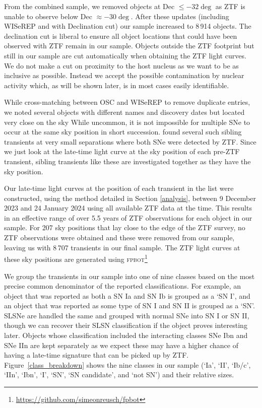 \documentclass[a4paper,oneside,12pt, class=Latex/Classes/PhDthesisPSnPDF, crop=false]{standalone}
\begin{document}
From the combined sample, we removed objects at Dec $\leq -32\deg$ as ZTF is unable to observe below Dec $\approx -30\deg$. After these updates (including WISeREP and with Declination cut) our sample increased to 8\,914 objects. The declination cut is liberal to ensure all object locations that could have been observed with ZTF remain in our sample. Objects outside the ZTF footprint but still in our sample are cut automatically when obtaining the ZTF light curves. We do not make a cut on proximity to the host nucleus as we want to be as inclusive as possible. Instead we accept the possible contamination by nuclear activity which, as will be shown later, is in most cases easily identifiable.

While cross-matching between OSC and WISeREP to remove duplicate entries, we noted several objects with different names and discovery dates but located very close on the sky While uncommon, it is not impossible for multiple SNe to occur at the same sky position in short succession. \citet{Terwel_2024_paper1} found several such sibling transients at very small separations where both SNe were detected by ZTF. Since we just look at the late-time light curve at the sky position of each pre-ZTF transient, sibling transients like these are investigated together as they have the sky position.

Our late-time light curves at the position of each transient in the list were constructed, using the method detailed in Section \ref{analysis}, between 9 December 2023 and 24 January 2024 using all available ZTF data at the time. This results in an effective range of over 5.5 years of ZTF observations for each object in our sample. For 207 sky positions that lay close to the edge of the ZTF survey, no ZTF observations were obtained and these were removed from our sample, leaving us with 8\,707 transients in our final sample. The ZTF light curves at these sky positions are generated using \textsc{fpbot}\footnote{\url{https://github.com/simeonreusch/fpbot}} \citep{fpbot}

We group the transients in our sample into one of nine classes based on the most precise common denominator of the reported classifications. For example, an object that was reported as both a SN Ia and SN Ib is grouped as a `SN I', and an object that was reported as some type of SN I and SN II is grouped as a `SN'. SLSNe are handled the same and grouped with normal SNe into SN I or SN II, though we can recover their SLSN classification if the object proves interesting later. Objects whose classification included the interacting classes SNe Ibn and SNe IIn are kept separately as we expect these may have a higher chance of having a late-time signature that can be picked up by ZTF. Figure~\ref{class_breakdown} shows the nine classes in our sample (`Ia', `II', `Ib/c', `IIn', `Ibn', `I', `SN', `SN candidate', and `not SN') and their relative sizes. 
\end{document}
